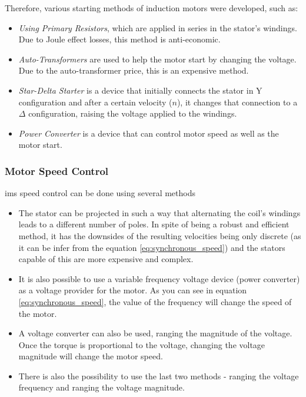 Therefore, various starting methods of induction motors were developed, such as:

\begin{itemize}
  \item 
  \emph{Using Primary Resistors}, which are applied in series in the stator's windings. Due to Joule effect losses, this method is anti-economic.
  \item 
  \emph{Auto-Transformers} are used to help the motor start by changing the voltage. Due to the auto-transformer price, this is an expensive method.
  \item 
  \emph{Star-Delta Starter} is a device that initially connects the stator in Y configuration and after a certain velocity ($n$), it changes that connection to a $\Delta$ configuration, raising the voltage applied to the windings.
  \item 
  \emph{Power Converter} is a device that can control motor speed as well as the motor start.
\end{itemize}

\subsubsection{Motor Speed Control}
\acrshort{ims} speed control can be done using several methods

\begin{itemize}
  \item 
  The stator can be projected in such a way that alternating the coil's windings leads to a different number of poles. In spite of being a robust and efficient method, it has the downsides of the resulting velocities being only discrete (as it can be infer from the equation \ref{eq:synchronous_speed}) and the stators capable of this are more expensive and complex. 
  \item 
  It is also possible to use a variable frequency voltage device (power converter) as a voltage provider for the motor. As you can see in equation \ref{eq:synchronous_speed}, the value of the frequency will change the speed of the motor.
  \item 
  A voltage converter can also be used, ranging the magnitude of the voltage. Once the torque is proportional to the voltage, changing the voltage magnitude will change the motor speed.
  \item 
  There is also the possibility to use the last two methods - ranging the voltage frequency and ranging the voltage magnitude.
\end{itemize}

